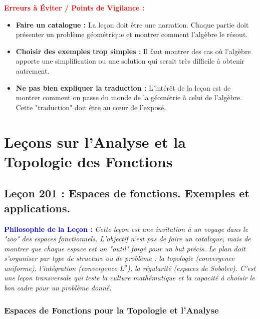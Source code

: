 \documentclass[12pt, a4paper, parskip=full]{report}
\theoremstyle{agregstyle}
\newenvironment{philosophie}
  {\par\medskip\noindent\begin{oframed}\noindent\textbf{\textcolor{blue}{Philosophie de la Leçon :}}\itshape}
  {\end{oframed}\par\medskip}
\newenvironment{erreurs}
  {\par\medskip\noindent\begin{oframed}\noindent\textbf{\textcolor{red}{Erreurs à Éviter / Points de Vigilance :}}}
  {\end{oframed}\par\medskip}
\begin{document}
\begin{erreurs}
    \begin{itemize}
        \item \textbf{Faire un catalogue :} La leçon doit être une narration. Chaque partie doit présenter un problème géométrique et montrer comment l'algèbre le résout.
        \item \textbf{Choisir des exemples trop simples :} Il faut montrer des cas où l'algèbre apporte une simplification ou une solution qui serait très difficile à obtenir autrement.
        \item \textbf{Ne pas bien expliquer la traduction :} L'intérêt de la leçon est de montrer comment on passe du monde de la géométrie à celui de l'algèbre. Cette "traduction" doit être au cœur de l'exposé.
    \end{itemize}
\end{erreurs}

\part{Leçons sur l'Analyse et la Topologie des Fonctions}

\chapter{Leçon 201 : Espaces de fonctions. Exemples et applications.}

\begin{philosophie}
    Cette leçon est une invitation à un voyage dans le "zoo" des espaces fonctionnels. L'objectif n'est pas de faire un catalogue, mais de montrer que chaque espace est un "outil" forgé pour un but précis. Le plan doit s'organiser par type de structure ou de problème : la topologie (convergence uniforme), l'intégration (convergence $L^p$), la régularité (espaces de Sobolev). C'est une leçon transversale qui teste la culture mathématique et la capacité à choisir le bon cadre pour un problème donné.
\end{philosophie}

\section{Espaces de Fonctions pour la Topologie et l'Analyse}
\end{document}
